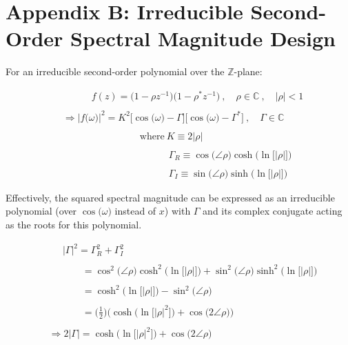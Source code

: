 \documentclass{article}
\begin{document}
\newpage
\section*{Appendix B: Irreducible Second-Order Spectral Magnitude Design}

For an irreducible second-order polynomial over the $\mathbb{Z}$-plane:

\begin{align*}
    &\quad \quad \quad f(z) = \big(1 - \rho z^{-1}\big)\big(1 - \rho^{*}z^{-1}\big) \ , \quad \rho \in \mathbb{C} \ , \quad \big|\rho\big| < 1 \\ \\
    &\Rightarrow \Big|f\big(\omega\big)\Big|^{2} = K^{2}\Big[\cos\big(\omega\big) - \Gamma\Big]\Big[\cos\big(\omega\big) - \Gamma^{*}\Big] \ , \quad \Gamma \in \mathbb{C} \\ \\ 
    & \quad \quad \quad \quad \quad \quad \quad \quad \text{where} \ K \equiv 2\big|\rho\big| \\ \\
    & \quad \quad \quad \quad \quad \quad \quad \quad \quad \quad \quad \Gamma_{R} \equiv \cos\big(\angle{\rho}\big)\cosh\Big(\ln\big[\big|\rho\big|\big]\Big) \\ \\  
    & \quad \quad \quad \quad \quad \quad \quad \quad \quad \quad \quad \Gamma_{I} \equiv \sin\big(\angle{\rho}\big)\sinh\Big(\ln\big[\big|\rho\big|\big]\Big)
  \end{align*}\newline

Effectively, the squared spectral magnitude can be expressed as an irreducible polynomial (over $\cos\big(\omega\big)$ instead of $x$) with $\Gamma$ and its complex conjugate acting as the roots for this polynomial.

\begin{align*}
    &\quad \ \ \big|\Gamma\big|^{2} = \Gamma_{R}^{2} + \Gamma_{I}^{2} \\ \\
    &\quad \quad \quad \ \ = \cos^{2}\big(\angle{\rho}\big)\cosh^{2}\Big(\ln\big[\big|\rho\big|\big]\Big) + \sin^{2}\big(\angle{\rho}\big)\sinh^{2}\Big(\ln\big[\big|\rho\big|\big]\Big) \\ \\
    &\quad \quad \quad \ \ = \cosh^{2}\Big(\ln\big[\big|\rho\big|\big]\Big) - \sin^{2}\big(\angle{\rho}\big) \\ \\
    &\quad \quad \quad \ \ = \bigg(\frac{1}{2}\bigg)\Bigg(\cosh\Big(\ln\big[\big|\rho\big|^{2}\big]\Big) + \cos\big(2\angle{\rho}\big)\Bigg) \\ \\
    &\Rightarrow 2\big|\Gamma\big| = \cosh\Big(\ln\big[\big|\rho\big|^{2}\big]\Big) + \cos\big(2\angle{\rho}\big)
  \end{align*}\newline
\end{document}
